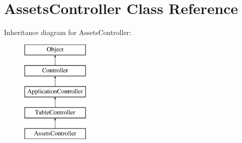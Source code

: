 \hypertarget{class_assets_controller}{
\section{AssetsController Class Reference}
\label{class_assets_controller}
}
Inheritance diagram for AssetsController:\begin{figure}[H]
\begin{center}
\leavevmode
\includegraphics[height=5.000000cm]{class_assets_controller}
\end{center}
\end{figure}
